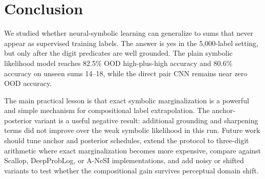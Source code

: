 \section{Conclusion}
\label{sec:conclusion}

We studied whether neural-symbolic learning can generalize to \addmnist sums that never appear as supervised training labels. The answer is yes in the 5,000-label setting, but only after the digit predicates are well grounded. The plain symbolic likelihood model reaches 82.5\% OOD high-plus-high accuracy and 80.6\% accuracy on unseen sums 14--18, while the direct pair CNN remains near zero OOD accuracy.

The main practical lesson is that exact symbolic marginalization is a powerful and simple mechanism for compositional label extrapolation. The anchor-posterior variant is a useful negative result: additional grounding and sharpening terms did not improve over the weak symbolic likelihood in this run. Future work should tune anchor and posterior schedules, extend the protocol to three-digit arithmetic where exact marginalization becomes more expensive, compare against Scallop, DeepProbLog, or A-NeSI implementations, and add noisy or shifted \mnist variants to test whether the compositional gain survives perceptual domain shift.
